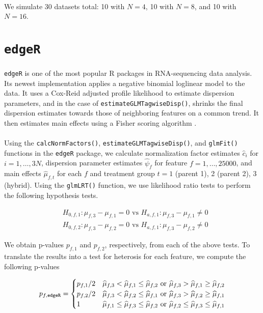 \documentclass{article}
\providecommand{\wh}[1]{\widehat{#1}}
\begin{document}
\begin{flushleft}
\paragraph{} We simulate 30 datasets total: 10 with $N = 4$, 10 with $N = 8$, and 10 with $N = 16$.

\section{{\tt edgeR}}

\paragraph{} {\tt edgeR} is one of the most popular R packages in RNA-sequencing data analysis. Its newest implementation applies a negative binomial loglinear model to the data. It uses a Cox-Reid adjusted profile likelihood to estimate dispersion parameters, and in the case of {\tt estimateGLMTagwiseDisp()}, shrinks the final dispersion estimates towards those of neighboring features on a common trend. It then estimates main effects using a Fisher scoring algorithm \cite{edgeR1} \cite{edgeR2}.

\paragraph{} Using the {\tt calcNormFactors()}, {\tt estimateGLMTagwiseDisp()}, and {\tt glmFit()} functions in the {\tt edgeR} package, we calculate normalization factor estimates $\wh{c}_i$ for $i = 1, \ldots, 3N$, dispersion parameter estimates $\wh{\psi}_{f}$ for feature $f = 1, \ldots, 25000$, and main effects $\wh{\mu}_{f, t}$ for each $f$ and treatment group $t = 1$ (parent 1), 2 (parent 2), 3 (hybrid). Using the {\tt glmLRT()} function, we use likelihood ratio tests to perform the following hypothesis tests.

\begin{align*}
&H_{0, f, 1} : \mu_{f, 3} - \mu_{f, 1} = 0 \text{ vs } H_{a, f, 1}: \mu_{f, 3} - \mu_{f, 1} \ne 0 \\
&H_{0, f, 2} : \mu_{f, 3} - \mu_{f, 2} = 0 \text{ vs } H_{a, f, 1}: \mu_{f, 3} - \mu_{f, 2} \ne 0
\end{align*}

We obtain p-values $p_{f, 1}$ and $p_{f, 2}$, respectively, from each of the above tests. To translate the results into a test for heterosis for each feature, we compute the following p-values

\begin{align*}
p_{f, {\tt edgeR}} = \begin{cases}
p_{f, 1}/2 & \wh{\mu}_{f, 3} < \wh{\mu}_{f, 1} \le \wh{\mu}_{f, 2} \text{ or } \wh{\mu}_{f, 3} > \wh{\mu}_{f, 1} \ge \wh{\mu}_{f, 2} \\
p_{f, 2}/2 & \wh{\mu}_{f, 3} < \wh{\mu}_{f, 2} \le \wh{\mu}_{f, 1} \text{ or } \wh{\mu}_{f, 3} > \wh{\mu}_{f, 2} \ge \wh{\mu}_{f, 1} \\
1 & \wh{\mu}_{f, 1} \le \wh{\mu}_{f, 3} \le \wh{\mu}_{f, 2} \text{ or } \wh{\mu}_{f, 2} \le \wh{\mu}_{f, 3} \le \wh{\mu}_{f, 1}
\end{cases}
\end{align*}


\end{flushleft}
\end{document}
